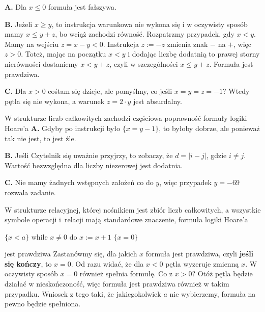 \begin{solutions}
    \textbf{A.} Dla $x\leq0$ formuła jest fałszywa.

    \textbf{B.} Jeżeli $x\geq y$, to instrukcja warunkowa nie wykona się i w oczywisty sposób mamy $x\leq y+z$, bo wciąż zachodzi równość. Rozpatrzmy przypadek, gdy $x<y$. Mamy na wejściu $z=x-y<0$. Instrukcja $z:=-z$ zmienia znak $-$ na $+$, więc $z>0$. Toteż, mając na początku $x<y$ i dodając liczbę dodatnią to prawej storny nierówności dostaniemy $x<y+z$, czyli w szczególności $x\leq y+z$. Formuła jest prawdziwa.

    \textbf{C.} Dla $x>0$ cośtam się dzieje, ale pomyślmy, co jeśli $x=y=z=-1$? Wtedy pętla się nie wykona, a warunek $z=2\cdot y$ jest absurdalny.

    \sol W strukturze liczb całkowitych zachodzi częściowa poprawność formuły logiki Hoare'a
    \textbf{A.} Gdyby po instrukcji było $\{x=y-1\}$, to byłoby dobrze, ale ponieważ tak nie jest, to jest źle.

    \textbf{B.} Jeśli Czytelnik się uważnie przyjrzy, to zobaczy, że $d=|i-j|$, gdzie $i\neq j$. Wartość bezwzględna dla liczby niezerowej jest dodatnia.

    \textbf{C.} Nie mamy żadnych wstępnych założeń co do $y$, więc przypadek $y=-69$ rozwala zadanie.

    \sol W strukturze relacyjnej, której nośnikiem jest zbiór liczb całkowitych, a wszystkie symbole operacji i~relacji mają standardowe znaczenie, formuła logiki Hoare'a
    \begin{center}
        $\{x < a\}$ while $x \neq 0$ do $x := x + 1$ $\{x = 0\}$
    \end{center}
    jest prawdziwa
    Zastanówmy się, dla jakich $x$ formuła jest prawdziwa, czyli \textbf{jeśli się kończy}, to $x=0$. Od razu widać, że dla $x<0$ pętla wyzeruje zmienną $x$. W oczywisty sposób $x=0$ również spełnia formułę. Co z $x>0$? Otóż pętla będzie działać w nieskończoność, więc formuła jest prawdziwa również w takim przypadku. Wniosek z tego taki, że jakiegokolwiek $a$ nie wybierzemy, formuła na pewno będzie spełniona.


\end{solutions}
